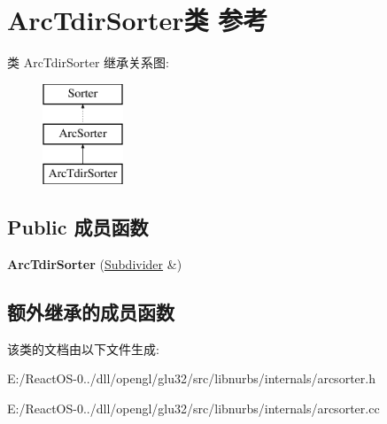 \hypertarget{class_arc_tdir_sorter}{}\section{Arc\+Tdir\+Sorter类 参考}
\label{class_arc_tdir_sorter}
类 Arc\+Tdir\+Sorter 继承关系图\+:\begin{figure}[H]
\begin{center}
\leavevmode
\includegraphics[height=3.000000cm]{class_arc_tdir_sorter}
\end{center}
\end{figure}
\subsection*{Public 成员函数}
\begin{DoxyCompactItemize}
\item 
\mbox{\label{class_arc_tdir_sorter_a38d4a20bd9fc73516ddde1c8f811f70d}} 
{\bfseries Arc\+Tdir\+Sorter} (\hyperlink{class_subdivider}{Subdivider} \&)
\end{DoxyCompactItemize}
\subsection*{额外继承的成员函数}


该类的文档由以下文件生成\+:\begin{DoxyCompactItemize}
\item 
E\+:/\+React\+O\+S-\/0../dll/opengl/glu32/src/libnurbs/internals/arcsorter.\+h\item 
E\+:/\+React\+O\+S-\/0../dll/opengl/glu32/src/libnurbs/internals/arcsorter.\+cc\end{DoxyCompactItemize}
